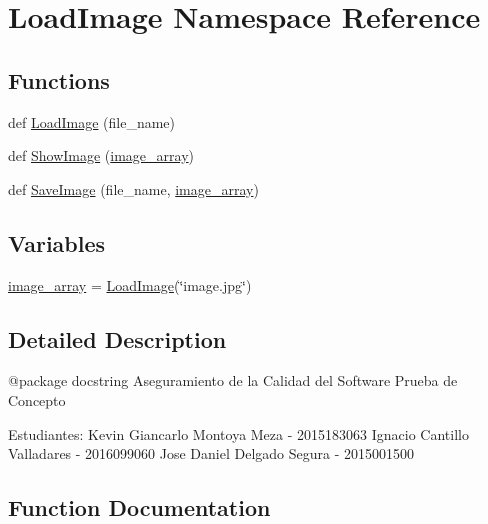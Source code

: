 \hypertarget{namespace_load_image}{}\section{Load\+Image Namespace Reference}
\label{namespace_load_image}
\subsection*{Functions}
\begin{DoxyCompactItemize}
\item 
def \mbox{\hyperlink{namespace_load_image_a6e3de0e286ea4f094dd609d99f15bd3c}{Load\+Image}} (file\+\_\+name)
\item 
def \mbox{\hyperlink{namespace_load_image_a226758f3bec41ee132236c4ae4ddf7ba}{Show\+Image}} (\mbox{\hyperlink{namespace_load_image_ab6829fed4966d0d3dac4f1b77b47f3d4}{image\+\_\+array}})
\item 
def \mbox{\hyperlink{namespace_load_image_a698cfc61c5d2b157416e98b9edfe5bf6}{Save\+Image}} (file\+\_\+name, \mbox{\hyperlink{namespace_load_image_ab6829fed4966d0d3dac4f1b77b47f3d4}{image\+\_\+array}})
\end{DoxyCompactItemize}
\subsection*{Variables}
\begin{DoxyCompactItemize}
\item 
\mbox{\hyperlink{namespace_load_image_ab6829fed4966d0d3dac4f1b77b47f3d4}{image\+\_\+array}} = \mbox{\hyperlink{namespace_load_image_a6e3de0e286ea4f094dd609d99f15bd3c}{Load\+Image}}(\char`\"{}image.\+jpg\char`\"{})
\end{DoxyCompactItemize}


\subsection{Detailed Description}
\begin{DoxyVerb}@package docstring
Aseguramiento de la Calidad del Software
Prueba de Concepto

Estudiantes:
Kevin Giancarlo Montoya Meza - 2015183063
Ignacio Cantillo Valladares - 2016099060
Jose Daniel Delgado Segura - 2015001500
\end{DoxyVerb}
 

\subsection{Function Documentation}
\mbox{\label{namespace_load_image_a6e3de0e286ea4f094dd609d99f15bd3c}} 
